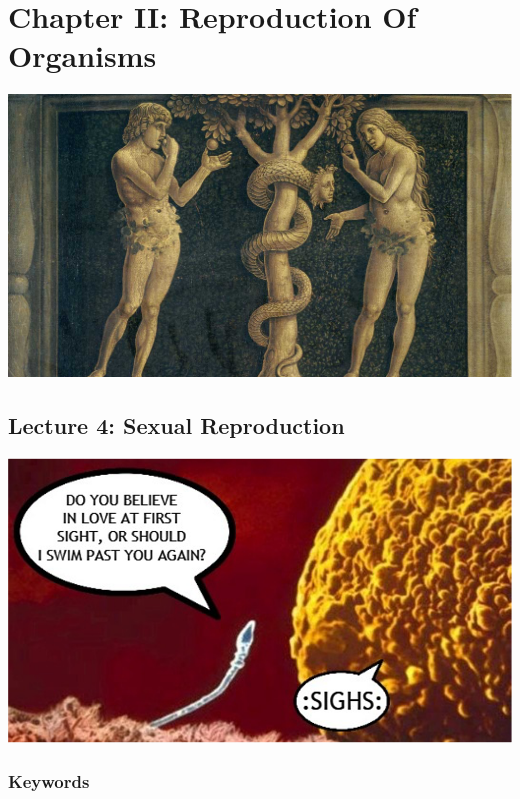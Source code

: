 \documentclass[
]{book}
\begin{document}
\hypertarget{chapter-ii-reproduction-of-organisms}{%
\chapter{Chapter II: Reproduction Of Organisms}\label{chapter-ii-reproduction-of-organisms}}

\includegraphics{./img/ch2.png}

\hypertarget{lecture-4-sexual-reproduction}{%
\section{Lecture 4: Sexual Reproduction}\label{lecture-4-sexual-reproduction}}

\includegraphics{./img/sperm-egg-meme.png}

\hypertarget{keywords}{%
\subsection{Keywords}\label{keywords}}
\end{document}
